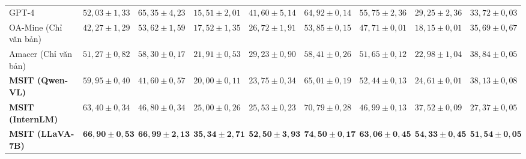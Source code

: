 \documentclass[conference,10pt]{IEEEtran}
\begin{document}
\begin{table}[!t]
{\begin{tabular}{lcccc|cccc}
GPT-4~\cite{openai2023gpt4} & $52,03 \pm 1,33$ & $65,35 \pm 4,23$ & $15,51 \pm 2,01$ & $41,60 \pm 5,14$ & $64,92 \pm 0,14$ & $55,75 \pm 2,36$ & $29,25 \pm 2,36$ & $33,72 \pm 0,03$ \\
OA-Mine (Chỉ văn bản)~\cite{zhang2022oamine} & $42,27 \pm 1,29$ & $53,62 \pm 1,59$ & $17,52 \pm 1,35$ & $26,72 \pm 1,91$ & $53,85 \pm 0,15$ & $47,71 \pm 0,01$ & $18,15 \pm 0,01$ & $35,69 \pm 0,67$ \\
Amacer (Chỉ văn bản)~\cite{xu2023amacer} & $51,27 \pm 0,82$ & $58,30 \pm 0,17$ & $21,91 \pm 0,53$ & $29,23 \pm 0,90$ & $58,41 \pm 0,26$ & $51,65 \pm 0,12$ & $22,98 \pm 1,04$ & $38,84 \pm 0,05$ \\
\midrule
\textbf{MSIT (Qwen-VL)} & $59,95 \pm 0,40$ & $41,60 \pm 0,57$ & $20,00 \pm 0,11$ & $23,75 \pm 0,34$ & $65,01 \pm 0,19$ & $52,44 \pm 0,13$ & $24,61 \pm 0,01$ & $38,13 \pm 0,08$ \\
\textbf{MSIT (InternLM)} & $63,40 \pm 0,34$ & $46,80 \pm 0,34$ & $25,00 \pm 0,26$ & $25,53 \pm 0,23$ & $70,79 \pm 0,28$ & $46,99 \pm 0,13$ & $37,52 \pm 0,09$ & $27,37 \pm 0,05$ \\
\textbf{MSIT (LLaVA-7B)} & $\mathbf{66,90 \pm 0,53}$ & $\mathbf{66,99 \pm 2,13}$ & $\mathbf{35,34 \pm 2,71}$ & $\mathbf{52,50 \pm 3,93}$ & $\mathbf{74,50 \pm 0,17}$ & $\mathbf{63,06 \pm 0,45}$ & $\mathbf{54,33 \pm 0,45}$ & $\mathbf{51,54 \pm 0,05}$ \\
\bottomrule
\end{tabular}
}
\end{table}
\end{document}
